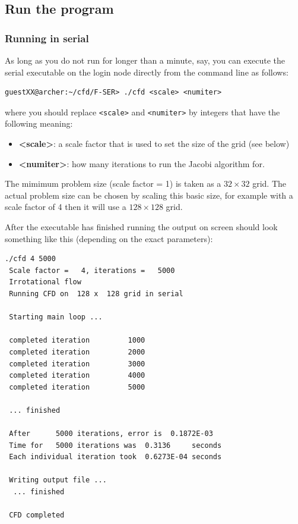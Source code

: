 \documentclass{article}
\begin{document}
\subsection{Run the program}

\subsubsection{Running in serial}
As long as you do not run for longer than a minute, say, 
you can execute the serial executable on the login
node directly from the command line as follows:

\begin{lstlisting}[frame=single]
guestXX@archer:~/cfd/F-SER> ./cfd <scale> <numiter>
\end{lstlisting}

where you should replace \verb+<scale>+ and \verb+<numiter>+
by integers that have the following meaning:

\begin{itemize}
\item{\bf <scale>}: a scale factor that is used to set the size of the
  grid (see below)
\item{\bf <numiter>}: how many iterations to run the Jacobi algorithm for.
\end{itemize}

The mimimum problem size (scale factor = 1) is taken as a
$32 \times 32$ grid. The actual problem size can be chosen by scaling
this basic size, for example with a scale factor of 4 then it will use
a $128 \times 128$ grid.

After the executable has finished running the output on screen 
should look something like this (depending on the exact parameters):

\begin{lstlisting}[frame=single]
 ./cfd 4 5000
 Scale factor =   4, iterations =   5000
 Irrotational flow
 Running CFD on  128 x  128 grid in serial 

 Starting main loop ...

 completed iteration         1000
 completed iteration         2000
 completed iteration         3000
 completed iteration         4000
 completed iteration         5000

 ... finished

 After      5000 iterations, error is  0.1872E-03
 Time for   5000 iterations was  0.3136     seconds
 Each individual iteration took  0.6273E-04 seconds

 Writing output file ...
  ... finished

 CFD completed
\end{lstlisting}
\end{document}
